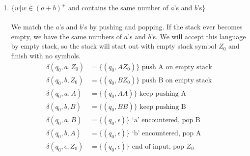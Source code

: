 \documentclass[8pt,letterpaper,twocolumn]{article}
\begin{document}
\begin{enumerate}
  \item %
  $\{w|w \in (a+b)^+$ and contains the same number of $a$'s and $b$'s$\}$  \\
  \\
  We match the $a$'s and $b$'s by pushing and popping.
  If the stack ever becomes empty, we have the same numbers of $a$'s and $b$'s.
  We will accept this language by empty stack, so the stack will start out with empty stack
  symbol $Z_0$ and finish with no symbols.
  \\
  \begin{align*}
    \delta(q_0, a, Z_0) &= \{(q_0, AZ_0)\} \mbox{ push A on empty stack} \\
    \delta(q_0, b, Z_0) &= \{(q_0, BZ_0)\} \mbox{ push B on empty stack} \\
    \delta(q_0, a, A) &= \{(q_0, AA)\} \mbox{ keep pushing A} \\
    \delta(q_0, b, B) &= \{(q_0, BB)\} \mbox{ keep pushing B} \\
    \delta(q_0, a, B) &= \{(q_0, \epsilon)\} \mbox{ `a' encountered, pop B} \\
    \delta(q_0, b, A) &= \{(q_0, \epsilon)\} \mbox{ `b' encountered, pop A} \\
    \delta(q_0, \epsilon, Z_0) &= \{(q_0, \epsilon)\} \mbox{ end of input, pop } Z_0
  \end{align*}
  

\end{enumerate}
\end{document}
